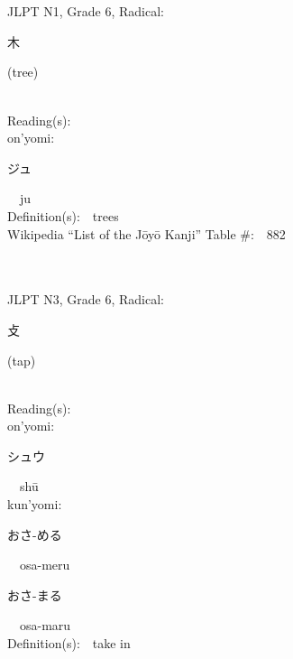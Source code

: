 \begin{multicols}{2}
\ \ \\
{\fontsize{34pt}{40pt}  }\ \ \\  %
{JLPT N1, Grade 6, Radical:\ \ {\begin{CJK}{UTF8}{min} 木 \end{CJK}} (tree) } \\
Reading(s):\ \ \\
{\hspace*{1em}}on'yomi:\ \ \\
{\hspace*{2em}}{\begin{CJK}{UTF8}{min} ジュ \end{CJK}}\ \ ju\ \ \\
Definition(s):\ \ trees \\
Wikipedia ``List of the J\=oy\=o Kanji'' Table \#:\ \ 882 \\
\ \ \\
{\fontsize{34pt}{40pt}  }\ \ \\  %
{JLPT N3, Grade 6, Radical:\ \ {\begin{CJK}{UTF8}{min} 攴 \end{CJK}} (tap) } \\
Reading(s):\ \ \\
{\hspace*{1em}}on'yomi:\ \ \\
{\hspace*{2em}}{\begin{CJK}{UTF8}{min} シュウ \end{CJK}}\ \ sh\=u\ \ \\
{\hspace*{1em}}kun'yomi:\ \ \\
{\hspace*{2em}}{\begin{CJK}{UTF8}{min} おさ-める \end{CJK}}\ \ osa-meru\ \ \\
{\hspace*{2em}}{\begin{CJK}{UTF8}{min} おさ-まる \end{CJK}}\ \ osa-maru\ \ \\
Definition(s):\ \ take in \\

\end{multicols}
